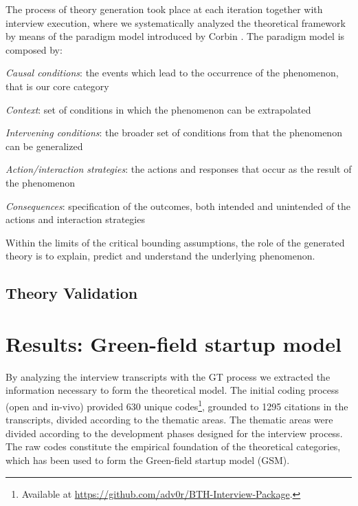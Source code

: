 \documentclass[10pt,journal,letterpaper,compsoc]{IEEEtran}
\begin{document}
The process of theory generation took place at each iteration together with 
interview execution, where we systematically analyzed the theoretical framework 
by means of the paradigm model introduced by Corbin \cite{Corbin1990}. The 
paradigm model is composed by: 

\begin{compactitem}
\item \textit{Causal conditions}: the events which lead to the occurrence of 
the phenomenon, that is our core category
\item \textit{Context}: set of conditions in which the phenomenon can be 
extrapolated
\item \textit{Intervening conditions}: the broader set of conditions from that 
the phenomenon can be generalized
\item \textit{Action/interaction strategies}: the actions and responses that 
occur as the result of the phenomenon
\item \textit{Consequences}: specification of the outcomes, both intended and 
unintended of the actions and interaction strategies
\end{compactitem}

Within the limits of the critical bounding assumptions, the role of the 
generated theory is to explain, predict and understand the underlying 
phenomenon.

\subsection{Theory Validation}


\section{Results: Green-field startup model}
\label{res:gsm}

By analyzing the interview transcripts with the GT process we extracted the 
information necessary to form the theoretical model. The initial coding process 
(open and in-vivo) provided 630 unique codes\footnote{Available at 
\url{https://github.com/adv0r/BTH-Interview-Package}.}, grounded to 1295 
citations in the transcripts, divided according to the thematic areas. The 
thematic areas were divided according to the development phases designed for the 
interview process. The raw codes constitute the empirical foundation of the 
theoretical categories, which has been used to form the Green-field startup 
model (GSM).
\end{document}
